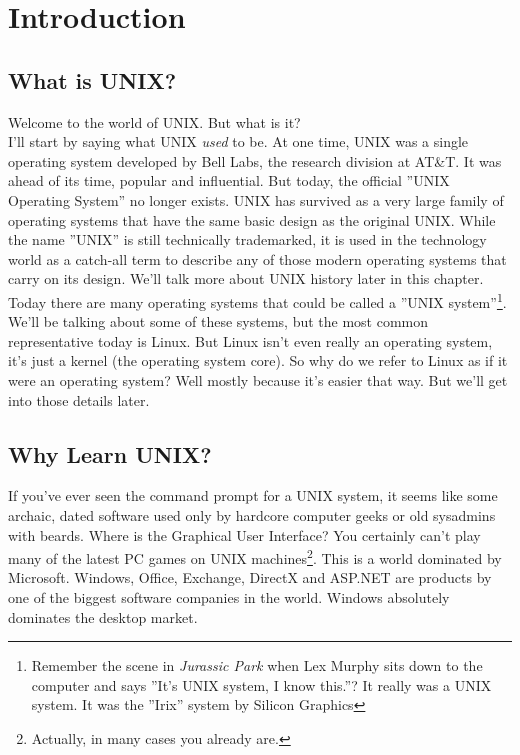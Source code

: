 \chapter{Introduction}

\section{What is UNIX?}

Welcome to the world of UNIX. But what is it?\\

I'll start by saying what UNIX \textit{used} to be. At one time, UNIX was a single operating system developed by Bell Labs, the research division at AT\&T. It was ahead of its time, popular and influential. But today, the official ''UNIX Operating System'' no longer exists. UNIX has survived as a very large family of operating systems that have the same basic design as the original UNIX. While the name ''UNIX'' is still technically trademarked, it is used in the technology world as a catch-all term to describe any of those modern operating systems that carry on its design. We'll talk more about UNIX history later in this chapter.\\

Today there are many operating systems that could be called a ''UNIX system''\footnote{Remember the scene in \textit{Jurassic Park} when Lex Murphy sits down to the computer and says ''It's UNIX system, I know this.''? It really was a UNIX system. It was the ''Irix'' system by Silicon Graphics}. We'll be talking about some of these systems, but the most common representative today is Linux.  But Linux isn't even really an operating system, it's just a kernel (the operating system core). So why do we refer to Linux as if it were an operating system? Well mostly because it's easier that way. But we'll get into those details later.\\

\section{Why Learn UNIX?}

If you've ever seen the command prompt for a UNIX system, it seems like some archaic, dated software used only by hardcore computer geeks or old sysadmins with beards.  Where is the Graphical User Interface? You certainly can't play many of the latest PC games on UNIX machines\footnote{Actually, in many cases you already are.}. This is a world dominated by Microsoft.  Windows, Office, Exchange, DirectX and ASP.NET are products by one of the biggest software companies in the world.  Windows absolutely dominates the desktop market.\\

